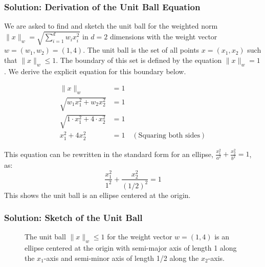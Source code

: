 \documentclass{article}
\begin{document}
\subsubsection*{Solution: Derivation of the Unit Ball Equation}
\parbox{\textwidth}{
We are asked to find and sketch the unit ball for the weighted norm $\|x\|_w = \sqrt{\sum_{i=1}^d w_i x_i^2}$ in $d=2$ dimensions with the weight vector $w=(w_1, w_2) = (1, 4)$. The unit ball is the set of all points $x = (x_1, x_2)$ such that $\|x\|_w \le 1$. The boundary of this set is defined by the equation $\|x\|_w = 1$. We derive the explicit equation for this boundary below.
}
\begin{align*}
    \|x\|_w &= 1 \\
    \sqrt{w_1 x_1^2 + w_2 x_2^2} &= 1 \\
    \sqrt{1 \cdot x_1^2 + 4 \cdot x_2^2} &= 1 \\
    x_1^2 + 4x_2^2 &= 1 \quad (\text{Squaring both sides})
\end{align*}
\parbox{\textwidth}{
This equation can be rewritten in the standard form for an ellipse, $\frac{x_1^2}{a^2} + \frac{x_2^2}{b^2} = 1$, as:
$$ \frac{x_1^2}{1^2} + \frac{x_2^2}{(1/2)^2} = 1 $$
This shows the unit ball is an ellipse centered at the origin.
}

\subsubsection*{Solution: Sketch of the Unit Ball}
\begin{figure}[h!]
\centering
{}
\caption{The unit ball $\|x\|_w \le 1$ for the weight vector $w=(1,4)$ is an ellipse centered at the origin with semi-major axis of length 1 along the $x_1$-axis and semi-minor axis of length 1/2 along the $x_2$-axis.}
\end{figure}
\end{document}
